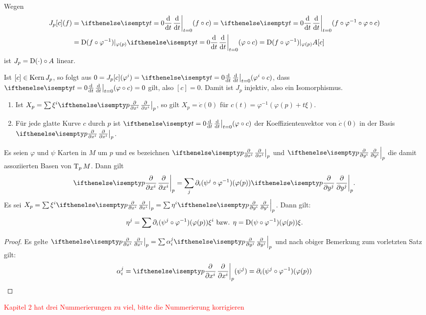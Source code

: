 \begin{bew}
  Wegen
  \begin{align*}
    J_p[c](f)& = \difffrac[t=0]{}{t}(f\circ c) = \difffrac[t=0]{}{t}(f \circ \varphi^{-1} \circ \varphi \circ c)\\
    &  = \D(f \circ \varphi^{-1})|_{\varphi(p)} \difffrac[t=0]{}{t} (\varphi \circ c) = \D (f\circ \varphi^{-1})|_{\varphi(p)}A[c]
  \end{align*}
  ist $J_p = \operatorname{D}(\cdot)\circ A$ linear.

  Ist $[c] \in \operatorname{Kern} J_p$, so folgt aus $0 = J_p[c](\varphi^i) = \difffrac[t=0]{}{t}(\varphi^i \circ c)$, dass $\difffrac[t=0]{}{t}(\varphi \circ c) = 0$ gilt, also $[c] = 0$. Damit ist $J_p$ injektiv, also ein Isomorphismus.
\end{bew}

\begin{Bem}
  \begin{enumerate}[label=\arabic*)]
  \item Ist $X_p = \sum \xi^i\pdifffrac[p]{}{x^i}$, so gilt $X_p = \dot c(0)$ für $c(t) = \varphi^{-1}(\varphi(p) + t\xi)$.
\item Für jede glatte Kurve $c$ durch $p$ ist $\difffrac[t=0]{}{t}(\varphi \circ c)$ der Koeffizientenvektor von $\dot c(0)$ in der Basis $\pdifffrac[p]{}{x^i}$.
  \end{enumerate}
\end{Bem}


\begin{Satz}
  Es seien $\varphi$ und $\psi$ Karten in $M$ um $p$ und es bezeichnen $\pdifffrac[p]{}{x^i}$ und $\pdifffrac[p]{}{y^i}$ die damit assoziierten Basen von $\operatorname{T}_pM$. Dann gilt
  \begin{align*}
    \pdifffrac[p]{}{x^i} = \sum_j \partial_i(\psi^j \circ \varphi^{-1})(\varphi(p)) \pdifffrac[p]{}{y^j}.
  \end{align*}
Es sei $X_p = \sum \xi^i \pdifffrac[p]{}{x^i} = \sum \eta^i\pdifffrac[p]{}{y^i}$. Dann gilt:
\begin{align*}
  \eta^j = \sum \partial_i(\psi^j \circ \varphi^{-1})(\varphi(p))\xi^i \text{ bzw. }
  \eta = \operatorname{D}(\psi \circ \varphi^{-1})(\varphi(p))\xi.
\end{align*}
\end{Satz}

\begin{proof}
  Es gelte $\pdifffrac[p]{}{x^i} = \sum \alpha_i^j\pdifffrac[p]{}{y^j}$ und nach obiger Bemerkung zum vorletzten Satz gilt:
  \begin{align*}
    \alpha_i^j = \pdifffrac[p]{}{x^i}(\psi^j) = \partial_i(\psi^j \circ \varphi^{-1})(\varphi(p))
  \end{align*}
\end{proof}

\textcolor{red}{Kapitel 2 hat drei Nummerierungen zu viel, bitte die Nummerierung korrigieren}

